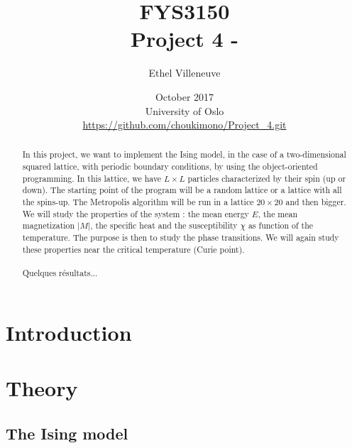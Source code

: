 \documentclass[a4paper, twoside, 11pt]{report}
\title{FYS3150\\Project 4 - }
\author{Ethel Villeneuve}
\date{October 2017 \\University of Oslo \\ \url{https://github.com/choukimono/Project_4.git}}
\theoremstyle{theorem}
\theoremstyle{remark}
\theoremstyle{exemple}
\begin{document}
\maketitle
	
	
\begin{abstract}
    
    \paragraph{}In this project, we want to implement the Ising model, in the case of a two-dimensional squared lattice, with periodic boundary conditions, by using the object-oriented programming. In this lattice, we have $L\times L$ particles characterized by their spin (up or down). The starting point of the program will be a random lattice or a lattice with all the spins-up. The Metropolis algorithm will be run in a lattice $20\times20$ and then bigger. We will study the properties of the system : the mean energy $E$, the mean magnetization $|M|$, the specific heat and the susceptibility $\chi$ as function of the temperature. The purpose is then to study the phase transitions. We will again study these properties near the critical temperature (Curie point).
    
    \paragraph{}Quelques résultats...
    
\end{abstract}


\tableofcontents


\chapter*{Introduction}

    \paragraph{}
    

\chapter{Theory}
    
    \section{The Ising model}
    
\end{document}
